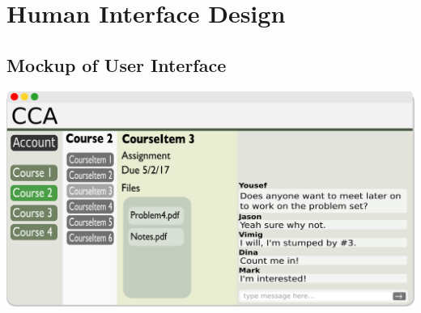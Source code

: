 \documentclass[16pt]{scrreprt}
\begin{document}

\chapter{Human Interface Design}

\section{Mockup of User Interface}

\includegraphics[width=1.0\textwidth]{diagrams/UI_Mockup.png}
\end{document}
